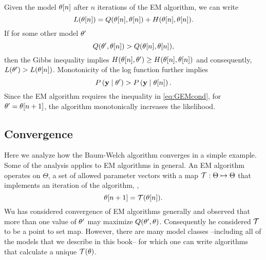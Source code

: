 Given the model ${\theta}{[n]}$ after $n$ iterations of the EM
algorithm, we can write
\begin{equation}
  L({\theta}{[n]}) = Q({\theta}{[n]}, {\theta}{[n]}) +
  H({\theta}{[n]}, {\theta}{[n]}).
\end{equation}
If for some other model $\theta'$
\begin{equation}
  \label{eq:GEMcond}
  Q(\theta',{\theta}{[n]}) >
  Q({\theta}{[n]},{\theta}{[n]}),
\end{equation}
then the Gibbs inequality implies $H({\theta}{[n]}, \theta') \geq H({\theta}{[n]},
{\theta}{[n]})$ and consequently, $L(\theta') >
L({\theta}{[n]})$.  Monotonicity of the log function further
implies
\begin{equation*}
  P \left(\mathbf{y} \mid \theta'\right) > P \left(\mathbf{y}\mid {\theta}{[n]} \right) .
\end{equation*}
Since the EM algorithm requires the inequality in \eqref{eq:GEMcond},
for $\theta' = {\theta}{[n+1]}$, the algorithm
monotonically increases the likelihood.

\subsection{Convergence}
%
Here we analyze how the Baum-Welch algorithm converges in a simple
example.  Some of the analysis applies to EM algorithms in general.
An EM algorithm operates on $\Theta$, a set of allowed parameter
vectors with a map $\EMmap:\Theta \mapsto \Theta$ that implements an
iteration of the algorithm, \ie,
\begin{equation*}
  \ti{\parameters}{n+1} = \EMmap (\ti{\parameters}{n}).
\end{equation*}
Wu\cite{Wu83} has considered convergence of EM algorithms generally
and observed that more than one value of $\theta'$ may maximize
$Q(\theta',\theta)$.  Consequently he considered $\EMmap$ to
be a point to set map.  However, there are many model classes
--including all of the models that we describe in this book-- for
which one can write algorithms that calculate a unique
$\EMmap(\parameters)$.


